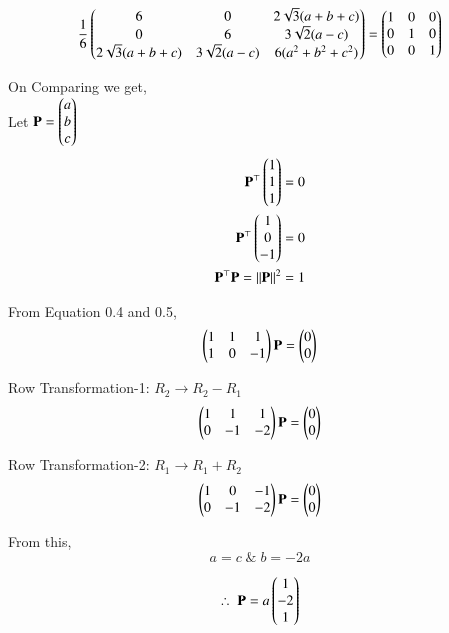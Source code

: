 \documentclass[journal]{IEEEtran}
\begin{document}
\begin{equation}
    \dfrac{1}{6} \begin{pmatrix}6 & 0 & 2\sqrt{3}(a+b+c) \\ 0 & 6 & 3\sqrt{2}(a-c) \\ 2\sqrt{3}(a+b+c) & 3\sqrt{2}(a-c) & 6(a^2 + b^2 + c^2)\end{pmatrix} = \begin{pmatrix}1 & 0 & 0 \\ 0 & 1 & 0 \\ 0 & 0 & 1\end{pmatrix}
\end{equation}

\newpage

On Comparing we get,\\
Let $\mathbf{P} = \begin{pmatrix}a \\ b \\c\end{pmatrix}$
\begin{align}
\mathbf{P}^\top\begin{pmatrix}1 \\ 1 \\ 1\end{pmatrix} &= 0\\
\mathbf{P}^\top\begin{pmatrix}1 \\ 0 \\ -1\end{pmatrix} &= 0\\
\mathbf{P}^\top\mathbf{P} = \left\lVert\mathbf{P}\right\rVert^2 &=  1
\end{align}

From Equation 0.4 and 0.5,
\begin{equation}
    \begin{pmatrix}1 & 1 & 1 \\ 1 & 0 & -1\end{pmatrix}\mathbf{P} = \begin{pmatrix}0 \\ 0\end{pmatrix}
\end{equation}

Row Transformation-1: $R_2 \rightarrow R_2 - R_1$
\begin{equation}
    \begin{pmatrix}1 & 1 & 1 \\ 0 & -1 & -2\end{pmatrix}\mathbf{P} = \begin{pmatrix}0 \\ 0\end{pmatrix}
\end{equation}

Row Transformation-2: $R_1 \rightarrow R_1 + R_2$
\begin{equation}
    \begin{pmatrix}1 & 0 & -1 \\ 0 & -1 & -2\end{pmatrix}\mathbf{P} = \begin{pmatrix}0 \\ 0\end{pmatrix}
\end{equation}

From this,
\begin{equation}
    a = c \; \& \; b = -2a
\end{equation}

\begin{equation}
  \therefore \;  \mathbf{P} = a\begin{pmatrix}1 \\ -2 \\ 1\end{pmatrix}
\end{equation}
\end{document}
